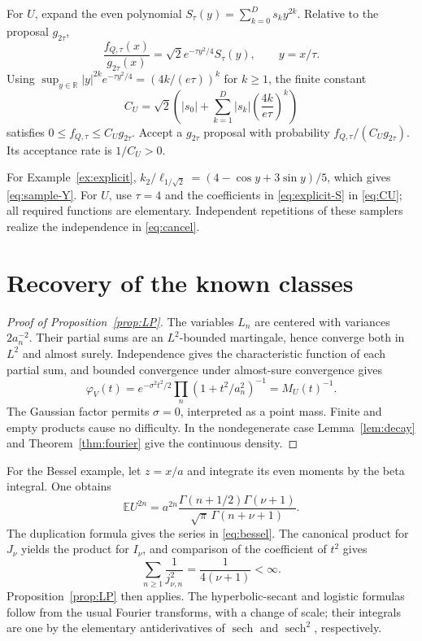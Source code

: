 \documentclass[11pt,twoside]{article}
\theoremstyle{journalplain}
\numberwithin{equation}{section}
\theoremstyle{journaldefinition}
\newcommand{\R}{\mathbb R}
\newcommand{\E}{\mathbb E}
\DeclareMathOperator{\sech}{sech}
\begin{document}
For $U$, expand the even polynomial $S_\tau(y)=\sum_{k=0}^Ds_ky^{2k}$. Relative to the proposal $g_{2\tau}$,
\[
 \frac{f_{Q,\tau}(x)}{g_{2\tau}(x)}
 =\sqrt2 e^{-\tau y^2/4}S_\tau(y),\qquad y=x/\tau.
\]
Using $\sup_{y\in\R}|y|^{2k}e^{-\tau y^2/4}=(4k/(e\tau))^k$ for $k\ge1$, the finite constant
\begin{equation}\label{eq:CU}
 C_U=\sqrt2\left(|s_0|+\sum_{k=1}^D|s_k|\left(\frac{4k}{e\tau}\right)^k\right)
\end{equation}
satisfies $0\le f_{Q,\tau}\le C_Ug_{2\tau}$. Accept a $g_{2\tau}$ proposal with probability $f_{Q,\tau}/(C_Ug_{2\tau})$. Its acceptance rate is $1/C_U>0$.

For Example~\ref{ex:explicit}, $k_2/\ell_{1/\sqrt2}=(4-\cos y+3\sin y)/5$, which gives \eqref{eq:sample-Y}. For $U$, use $\tau=4$ and the coefficients in \eqref{eq:explicit-S} in \eqref{eq:CU}; all required functions are elementary. Independent repetitions of these samplers realize the independence in \eqref{eq:cancel}.

\section{Recovery of the known classes}\label{app:known}
\begin{proof}[Proof of Proposition~\ref{prop:LP}]
The variables $L_n$ are centered with variances $2a_n^{-2}$. Their partial sums are an $L^2$-bounded martingale, hence converge both in $L^2$ and almost surely. Independence gives the characteristic function of each partial sum, and bounded convergence under almost-sure convergence gives
\[
 \varphi_V(t)=e^{-\sigma^2t^2/2}\prod_n(1+t^2/a_n^2)^{-1}=M_U(t)^{-1}.
\]
The Gaussian factor permits $\sigma=0$, interpreted as a point mass. Finite and empty products cause no difficulty. In the nondegenerate case Lemma~\ref{lem:decay} and Theorem~\ref{thm:fourier} give the continuous density.
\end{proof}

For the Bessel example, let $z=x/a$ and integrate its even moments by the beta integral. One obtains
\[
 \E U^{2n}=a^{2n}\frac{\Gamma(n+1/2)\Gamma(\nu+1)}{\sqrt\pi\,\Gamma(n+\nu+1)}.
\]
The duplication formula gives the series in \eqref{eq:bessel}. The canonical product for $J_\nu$ yields the product for $I_\nu$, and comparison of the coefficient of $t^2$ gives
\[
 \sum_{n\ge1}\frac1{j_{\nu,n}^2}=\frac1{4(\nu+1)}<\infty.
\]
Proposition~\ref{prop:LP} then applies. The hyperbolic-secant and logistic formulas follow from the usual Fourier transforms, with a change of scale; their integrals are one by the elementary antiderivatives of $\sech$ and $\sech^2$, respectively.
\end{document}
